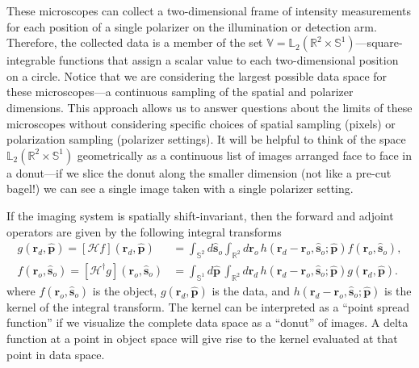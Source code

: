\documentclass[11pt]{article}
\providecommand{\mb}[1]{\mathbf{#1}}
\providecommand{\ro}[1]{\mathbf{\mathbf{r}}_o}
\providecommand{\so}[1]{\mathbf{\hat{s}}_o}
\providecommand{\rd}[1]{\mathbf{r}_d}
\providecommand{\mh}[1]{\mathbf{\hat{#1}}}
\providecommand{\mbb}[1]{\mathbb{#1}}
\begin{document}
These microscopes can collect a two-dimensional frame of intensity measurements
for each position of a single polarizer on the illumination or detection arm.
Therefore, the collected data is a member of the set
$\mbb{V} = \mbb{L}_2(\mbb{R}^2 \times \mbb{S}^1)$---square-integrable functions
that assign a scalar value to each two-dimensional position on a circle. Notice
that we are considering the largest possible data space for these
microscopes---a continuous sampling of the spatial and polarizer dimensions.
This approach allows us to answer questions about the limits of these
microscopes without considering specific choices of spatial sampling (pixels) or
polarization sampling (polarizer settings). It will be helpful to think of the
space $\mbb{L}_2(\mbb{R}^2 \times \mbb{S}^1)$ geometrically as a continuous list
of images arranged face to face in a donut---if we slice the donut along the
smaller dimension (not like a pre-cut bagel!) we can see a single
image taken with a single polarizer setting.

If the imaging system is spatially shift-invariant, then the forward and adjoint operators are given by the following integral transforms
\begin{align}
  g(\rd{}, \mh{p}) = [\mathcal{H}f](\rd{}, \hat{\mb{p}}) &= \int_{\mbb{S}^2}d\so{}\int_{\mbb{R}^2}d\ro{}\, h(\rd{} -\ro{}, \so{}; \hat{\mb{p}})f(\ro{}, \so{}),\\
  f(\ro{}, \so{}) =  [\mathcal{H}^{\dagger}g](\ro{}, \so{}) &= \int_{\mbb{S}^1}d\hat{\mb{p}}\, \int_{\mbb{R}^2}d\mb{r}_{d}\, h(\rd{} - \ro{}, \so{}; \hat{\mb{p}})g(\rd{}, \hat{\mb{p}}).
\end{align}
where $f(\ro{}, \so{})$ is the object, $g(\rd{}, \hat{\mb{p}})$ is the data, and
$h(\rd{} -\ro{}, \so{}; \hat{\mb{p}})$ is the kernel of the integral transform.
The kernel can be interpreted as a ``point spread function'' if we visualize the
complete data space as a ``donut'' of images. A delta function at a point in object
space will give rise to the kernel evaluated at that point in data space.
\end{document}
